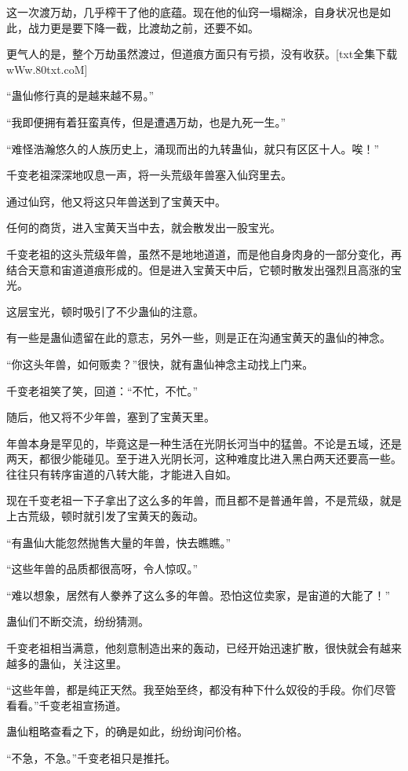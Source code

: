 \begin{this_body}
这一次渡万劫，几乎榨干了他的底蕴。现在他的仙窍一塌糊涂，自身状况也是如此，战力更是要下降一截，比渡劫之前，还要不如。

更气人的是，整个万劫虽然渡过，但道痕方面只有亏损，没有收获。[txt全集下载wWw.80txt.coM]

“蛊仙修行真的是越来越不易。”

“我即便拥有着狂蛮真传，但是遭遇万劫，也是九死一生。”

“难怪浩瀚悠久的人族历史上，涌现而出的九转蛊仙，就只有区区十人。唉！”

千变老祖深深地叹息一声，将一头荒级年兽塞入仙窍里去。

通过仙窍，他又将这只年兽送到了宝黄天中。

任何的商货，进入宝黄天当中去，就会散发出一股宝光。

千变老祖的这头荒级年兽，虽然不是地地道道，而是他自身肉身的一部分变化，再结合天意和宙道道痕形成的。但是进入宝黄天中后，它顿时散发出强烈且高涨的宝光。

这层宝光，顿时吸引了不少蛊仙的注意。

有一些是蛊仙遗留在此的意志，另外一些，则是正在沟通宝黄天的蛊仙的神念。

“你这头年兽，如何贩卖？”很快，就有蛊仙神念主动找上门来。

千变老祖笑了笑，回道：“不忙，不忙。”

随后，他又将不少年兽，塞到了宝黄天里。

年兽本身是罕见的，毕竟这是一种生活在光阴长河当中的猛兽。不论是五域，还是两天，都很少能碰见。至于进入光阴长河，这种难度比进入黑白两天还要高一些。往往只有转序宙道的八转大能，才能进入自如。

现在千变老祖一下子拿出了这么多的年兽，而且都不是普通年兽，不是荒级，就是上古荒级，顿时就引发了宝黄天的轰动。

“有蛊仙大能忽然抛售大量的年兽，快去瞧瞧。”

“这些年兽的品质都很高呀，令人惊叹。”

“难以想象，居然有人豢养了这么多的年兽。恐怕这位卖家，是宙道的大能了！”

蛊仙们不断交流，纷纷猜测。

千变老祖相当满意，他刻意制造出来的轰动，已经开始迅速扩散，很快就会有越来越多的蛊仙，关注这里。

“这些年兽，都是纯正天然。我至始至终，都没有种下什么奴役的手段。你们尽管看看。”千变老祖宣扬道。

蛊仙粗略查看之下，的确是如此，纷纷询问价格。

“不急，不急。”千变老祖只是推托。


\end{this_body}
